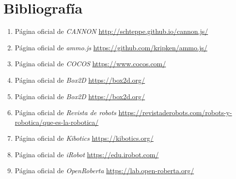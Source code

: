 \chapter{Bibliografía}
\label{chap:bibliografia} 

\begin{enumerate}[1.]
    \item Página oficial de \textit{CANNON} \newline
\url{http://schteppe.github.io/cannon.js/}\newline

\item Página oficial de \textit{ammo.js} \newline
\url{https://github.com/kripken/ammo.js/}\newline

\item Página oficial de \textit{COCOS}\newline
\url{https://www.cocos.com/}\newline

\item Página oficial de \textit{Box2D}\newline
\url{https://box2d.org/}\newline

\item Página oficial de \textit{Box2D}\newline
\url{https://box2d.org/}\newline

\item Página oficial de \textit{Revista de robots}\newline
\url{https://revistaderobots.com/robots-y-robotica/que-es-la-robotica/}\newline

\item Página oficial de \textit{Kibotics}\newline
\url{https://kibotics.org/}\newline

\item Página oficial de \textit{iRobot}\newline
\url{https://edu.irobot.com/}\newline

\item Página oficial de \textit{OpenRoberta}\newline
\url{https://lab.open-roberta.org/}\newline


\end{enumerate}
